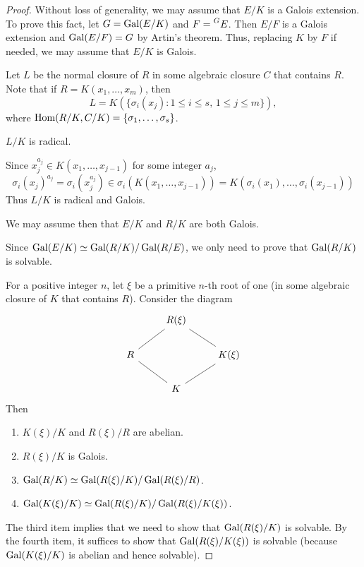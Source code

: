 \begin{proof}
    Without loss of generality, 
    we may assume that $E/K$ is a Galois extension. To prove this fact, 
    let $G=\operatorname{Gal}(E/K)$ and $F=\prescript{G}{}{E}$. Then
    $E/F$ is a Galois extension and $\operatorname{Gal}(E/F)=G$ by Artin's theorem. 
    Thus, replacing $K$ by $F$ if needed, we may assume that
    $E/K$ is Galois. 
    
    Let $L$ be the normal closure of $R$ in some
    algebraic closure $C$ that contains $R$. Note that 
    if $R=K(x_1,\dots,x_m)$, then 
    \[
    L=K(\{\sigma_i(x_j):1\leq i\leq s,\,1\leq j\leq m\}),
    \]
    where $\operatorname{Hom}(R/K,C/K)=\{\sigma_1,\dots,\sigma_s\}$. 
    
    \begin{claim}
        $L/K$ is radical. 
    \end{claim}
    
    Since $x_j^{a_j}\in K(x_1,\dots,x_{j-1})$ for some integer $a_j$, 
    \[
    \sigma_i(x_j)^{a_j}=\sigma_i\left(x_j^{a_j}\right)\in\sigma_i(K(x_1,\dots,x_{j-1}))=K(\sigma_i(x_1),\dots,\sigma_i(x_{j-1}))
    \]
    Thus $L/K$ is radical and Galois. 
    
    We may assume then that $E/K$ and $R/K$ are both Galois. 
    
    Since $\operatorname{Gal}(E/K)\simeq\operatorname{Gal}(R/K)/\operatorname{Gal}(R/E)$, we only need
    to prove that $\operatorname{Gal}(R/K)$ is solvable. 
    
    For a positive integer $n$, 
    let $\xi$ be a primitive $n$-th root of one (in some algebraic closure
    of $K$ that contains $R$). Consider the diagram
    \[
    \begin{tikzcd}
	& {R(\xi)} \\
	R && {K(\xi)} \\
	& K
	\arrow[no head, from=1-2, to=2-3]
	\arrow[no head, from=1-2, to=2-1]
	\arrow[no head, from=2-1, to=3-2]
	\arrow[no head, from=3-2, to=2-3]
    \end{tikzcd}
    \]
    Then
    \begin{enumerate}
        \item $K(\xi)/K$ and $R(\xi)/R$ are abelian.
        \item $R(\xi)/K$ is Galois.
        \item $\operatorname{Gal}(R/K)\simeq\operatorname{Gal}(R(\xi)/K)/\operatorname{Gal}(R(\xi)/R)$. 
        \item $\operatorname{Gal}(K(\xi)/K)\simeq\operatorname{Gal}(R(\xi)/K)/\operatorname{Gal}(R(\xi)/K(\xi))$. 
    \end{enumerate}
    The third item implies that we need to 
    show that $\operatorname{Gal}(R(\xi)/K)$ is solvable. By the fourth item,
    it suffices to show that $\operatorname{Gal}(R(\xi)/K(\xi))$ is solvable (because $\operatorname{Gal}(K(\xi)/K)$ is abelian and hence solvable). 
    

\end{proof}
